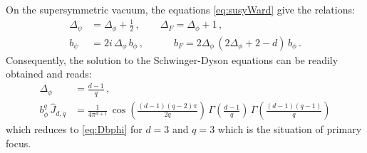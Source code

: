 \documentclass[11pt]{article}
\begin{document}
On the supersymmetric vacuum, the equations \eqref{eq:susyWard} give the relations:
%
\begin{equation}
\begin{split}
\Delta_\psi 
&=
	\Delta_\phi+ \frac{1}{2} \,, \qquad  
	\Delta_F=\Delta_\phi+1\,,  \\
b_\psi 
&= 
	2i\,\Delta_\phi\, b_\phi\,, 
	\qquad  \quad \!  b_F=2\Delta_\phi \, (2\Delta_\phi+2-d)\,b_\phi\,.
\end{split}
\end{equation}	
%
Consequently, the solution to the Schwinger-Dyson equations can be readily obtained and reads:
%
\begin{equation}
\begin{split}
\Delta_\phi 
& =
	 \frac{d-1}{q} \,,\\
b_\phi^q \, \hat{J}_{d,q} 
&= 
	\frac{1}{4\pi^{d+1}}  \, \cos\left(\frac{(d-1)(q-2) \pi}{2q}\right)\, \Gamma\left(\frac{d-1}{q}\right) \, \Gamma\left(\frac{(d-1)(q-1)}{q}\right)
\end{split}
\end{equation}	
%
which reduces to \eqref{eq:Dbphi} for $d=3$ and $q=3$ which is the situation of primary focus. 
\end{document}
